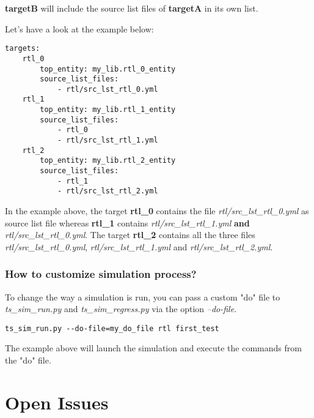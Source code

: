 \documentclass{tropic_design_spec}
\begin{document}
\textbf{targetB} will include the source list files of \textbf{targetA} in its own list.

Let's have a look at the example below:
\begin{lstlisting}
targets:
    rtl_0
        top_entity: my_lib.rtl_0_entity
        source_list_files:
            - rtl/src_lst_rtl_0.yml
    rtl_1
        top_entity: my_lib.rtl_1_entity
        source_list_files:
            - rtl_0
            - rtl/src_lst_rtl_1.yml
    rtl_2
        top_entity: my_lib.rtl_2_entity
        source_list_files:
            - rtl_1
            - rtl/src_lst_rtl_2.yml
\end{lstlisting}

In the example above, the target \textbf{rtl_0} contains the file \textit{rtl/src_lst_rtl_0.yml}
as source list file whereas \textbf{rtl_1} contains \textit{rtl/src_lst_rtl_1.yml} \textbf{and}
\textit{rtl/src_lst_rtl_0.yml}. The target \textbf{rtl_2} contains all the three files
\textit{rtl/src_lst_rtl_0.yml}, \textit{rtl/src_lst_rtl_1.yml} and
\textit{rtl/src_lst_rtl_2.yml}.


\subsubsection{How to customize simulation process?}
\label{sec:how-to-customize-simulation-process}

To change the way a simulation is run, you can pass a custom "do" file to
\textit{ts_sim_run.py} and \textit{ts_sim_regress.py} via the option \textit{--do-file}.

\begin{lstlisting}
ts_sim_run.py --do-file=my_do_file rtl first_test
\end{lstlisting}

The example above will launch the simulation and execute the commands from the "do" file.


\pagebreak
\section{Open Issues}

\PrintOpenIssueSummary
 
\end{document}

